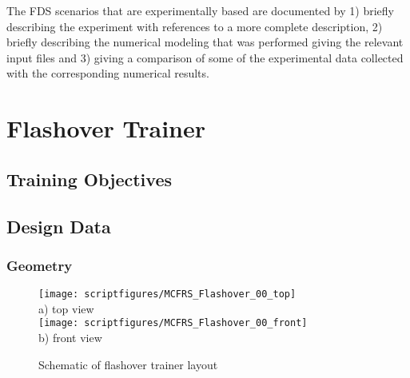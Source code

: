 \documentclass[11pt]{book}
\begin{document}
The FDS scenarios that are experimentally based are documented by 1) briefly describing the experiment with references to a more complete description, 2) briefly describing the numerical modeling that was performed giving the relevant input files and 3) giving a comparison of some of the experimental data collected with the corresponding numerical results.




%




\chapter{Flashover Trainer}

\section{Training Objectives}

\section{Design Data}
\subsection{Geometry}
\begin{figure}[\figoptions]
\begin{center}
\texttt{[image: scriptfigures/MCFRS\_Flashover\_00\_top]}\\
a) top view\\
\texttt{[image: scriptfigures/MCFRS\_Flashover\_00\_front]}\\
b) front view\\
\end{center}
\caption {Schematic of flashover trainer layout}
\label{figflashoverplan}%
\end{figure}
\end{document}
